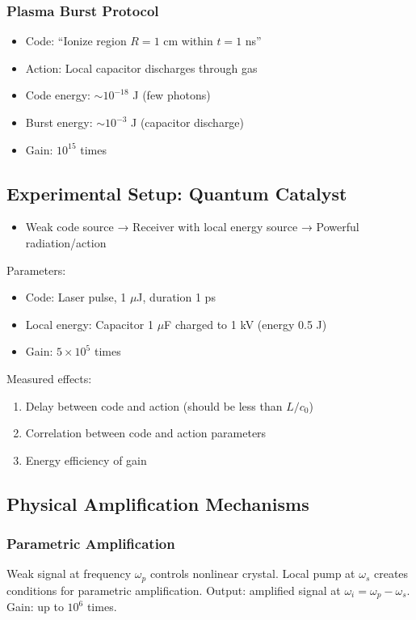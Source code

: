 \documentclass[11pt,a4paper]{article}
\begin{document}
	\subsubsection{Plasma Burst Protocol}
	\begin{itemize}
		\item Code: ``Ionize region $R=1$ cm within $t=1$ ns''
		\item Action: Local capacitor discharges through gas
		\item Code energy: $\sim 10^{-18}$ J (few photons)
		\item Burst energy: $\sim 10^{-3}$ J (capacitor discharge)
		\item Gain: $10^{15}$ times
	\end{itemize}
	
	\subsection{Experimental Setup: Quantum Catalyst}
	
	\begin{itemize}
		\item Weak code source → Receiver with local energy source → Powerful radiation/action
	\end{itemize}
	
	Parameters:
	\begin{itemize}
		\item Code: Laser pulse, 1 $\mu$J, duration 1 ps
		\item Local energy: Capacitor 1 $\mu$F charged to 1 kV (energy 0.5 J)
		\item Gain: $5 \times 10^5$ times
	\end{itemize}
	
	Measured effects:
	\begin{enumerate}
		\item Delay between code and action (should be less than $L/c_0$)
		\item Correlation between code and action parameters
		\item Energy efficiency of gain
	\end{enumerate}
	
	\subsection{Physical Amplification Mechanisms}
	
	\subsubsection{Parametric Amplification}
	Weak signal at frequency $\omega_p$ controls nonlinear crystal. Local pump at $\omega_s$ creates conditions for parametric amplification. Output: amplified signal at $\omega_i = \omega_p - \omega_s$. Gain: up to $10^6$ times.
	
\end{document}
